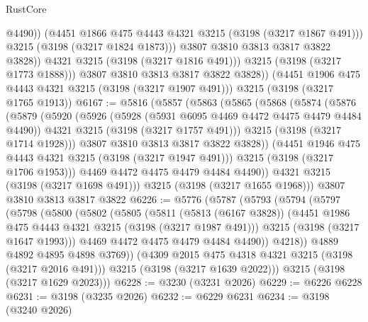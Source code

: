 \begin{lexlean}{RustCore}
\begin{coremodule}
                      @4490))
                  (@4451 @1866 @475 @4443 @4321 @3215 (@3198 (@3217 @1867 @491)))
                  @3215
                  (@3198 (@3217 @1824 @1873)))
                @3807
                @3810
                @3813
                @3817
                @3822
                @3828))
            @4321
            @3215
            (@3198 (@3217 @1816 @491)))
          @3215
          (@3198 (@3217 @1773 @1888)))
        @3807
        @3810
        @3813
        @3817
        @3822
        @3828))
    (@4451 @1906 @475 @4443 @4321 @3215 (@3198 (@3217 @1907 @491)))
    @3215
    (@3198 (@3217 @1765 @1913))
@6167 := @5816
    (@5857
      (@5863
        (@5865
          (@5868
            (@5874
              (@5876
                (@5879
                  (@5920
                    (@5926
                      (@5928 (@5931 @6095 @4469 @4472 @4475 @4479 @4484 @4490))
                      @4321
                      @3215
                      (@3198 (@3217 @1757 @491)))
                    @3215
                    (@3198 (@3217 @1714 @1928)))
                  @3807
                  @3810
                  @3813
                  @3817
                  @3822
                  @3828))
              (@4451 @1946 @475 @4443 @4321 @3215 (@3198 (@3217 @1947 @491)))
              @3215
              (@3198 (@3217 @1706 @1953)))
            @4469
            @4472
            @4475
            @4479
            @4484
            @4490))
        @4321
        @3215
        (@3198 (@3217 @1698 @491)))
      @3215
      (@3198 (@3217 @1655 @1968)))
    @3807
    @3810
    @3813
    @3817
    @3822
@6226 := @5776
    (@5787
      (@5793
        (@5794
          (@5797
            (@5798
              (@5800
                (@5802
                  (@5805
                    (@5811
                      (@5813 (@6167 @3828))
                      (@4451 @1986 @475 @4443 @4321 @3215 (@3198 (@3217 @1987 @491)))
                      @3215
                      (@3198 (@3217 @1647 @1993)))
                    @4469
                    @4472
                    @4475
                    @4479
                    @4484
                    @4490))
                @4218))
            @4889
            @4892
            @4895
            @4898
            @3769))
        (@4309 @2015 @475 @4318 @4321 @3215 (@3198 (@3217 @2016 @491)))
        @3215
        (@3198 (@3217 @1639 @2022)))
      @3215
      (@3198 (@3217 @1629 @2023)))
@6228 := @3230 (@3231 @2026)
@6229 := @6226 @6228
@6231 := @3198 (@3235 @2026)
@6232 := @6229 @6231
@6234 := @3198 (@3240 @2026)

\end{coremodule}
\end{lexlean}
